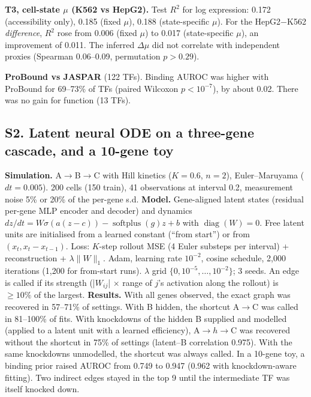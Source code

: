\documentclass[10pt]{article}
\begin{document}
\textbf{T3, cell-state $\mu$ (K562 vs HepG2).} Test $R^2$ for log expression: 0.172 (accessibility only), 0.185 (fixed $\mu$), 0.188 (state-specific $\mu$). For the HepG2$-$K562 \emph{difference}, $R^2$ rose from 0.006 (fixed $\mu$) to 0.017 (state-specific $\mu$), an improvement of 0.011.
The inferred $\Delta\mu$ did not correlate with independent proxies (Spearman 0.06--0.09, permutation $p>0.29$).

\textbf{ProBound vs JASPAR} (122 TFs). Binding AUROC was higher with ProBound for 69--73\% of TFs (paired Wilcoxon $p<10^{-7}$), by about 0.02. There was no gain for function (13 TFs).

\subsection*{S2. Latent neural ODE on a three-gene cascade, and a 10-gene toy}
\textbf{Simulation.} A$\to$B$\to$C with Hill kinetics ($K=0.6$, $n=2$), Euler--Maruyama ($dt=0.005$). 200 cells (150 train), 41 observations at interval 0.2, measurement noise 5\% or 20\% of the per-gene s.d.
\textbf{Model.} Gene-aligned latent states (residual per-gene MLP encoder and decoder) and dynamics $dz/dt=W\sigma(a(z-c))-\operatorname{softplus}(g)z+b$ with $\operatorname{diag}(W)=0$. Free latent units are initialised from a learned constant (``from start'') or from $(x_t,x_t-x_{t-1})$.
Loss: $K$-step rollout MSE (4 Euler substeps per interval) + reconstruction + $\lambda\|W\|_1$. Adam, learning rate $10^{-2}$, cosine schedule, 2{,}000 iterations (1{,}200 for from-start runs). $\lambda$ grid $\{0,10^{-5},\dots,10^{-2}\}$; 3 seeds. An edge is called if its strength (|$W_{ij}$| $\times$ range of $j$'s activation along the rollout) is $\ge10\%$ of the largest.
\textbf{Results.} With all genes observed, the exact graph was recovered in 57--71\% of settings. With B hidden, the shortcut A$\to$C was called in 81--100\% of fits. With knockdowns of the hidden B supplied and modelled (applied to a latent unit with a learned efficiency), A$\to h\to$C was recovered without the shortcut in 75\% of settings (latent--B correlation 0.975). With the same knockdowns unmodelled, the shortcut was always called.
In a 10-gene toy, a binding prior raised AUROC from 0.749 to 0.947 (0.962 with knockdown-aware fitting). Two indirect edges stayed in the top 9 until the intermediate TF was itself knocked down.
\end{document}
